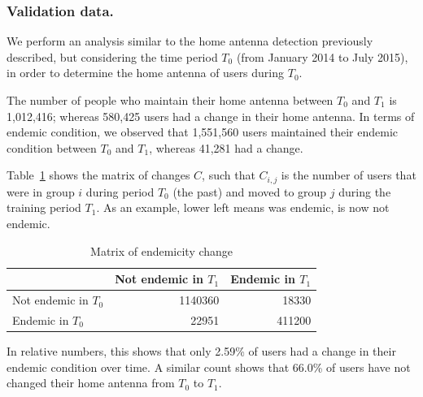 

\subsubsection{Validation data.} %

We perform an analysis similar to the home antenna detection previously described, 
but considering the time period $T_0$ (from January 2014 to July 2015),
in order to determine the home antenna of users during $T_0$.

The number of people who maintain their home antenna between $T_0$ and $T_1$ is 1,012,416;
whereas 580,425 users had a change in their home antenna.
In terms of endemic condition, we observed that 1,551,560 users maintained their endemic condition
between $T_0$ and $T_1$, whereas 41,281 had a change.


%
%
%

Table~\ref{tab:changes} 
shows the matrix of changes $C$, such that $C_{i, j}$ is the number of users that were in group $i$ during period $T_0$ (the past) and moved to group $j$ during the training period $T_1$. As an example, lower left means was endemic, is now not endemic. 

\begin{table}[ht]
	\caption{Matrix of endemicity change}
	\label{tab:changes}
	\centering
	\begin{tabular}{l r r }
		\toprule
		& Not endemic in $T_1$ & Endemic in $T_1$ \\
		\midrule
		Not endemic in $T_0$ & 1140360 & 18330  \\
		Endemic in $T_0$     & 22951   & 411200 \\
		\bottomrule
	\end{tabular}
\end{table}

In relative numbers, this shows that only 2.59\% of users had a change in their endemic condition over time. A similar count shows that 66.0\% of users have not changed their home antenna from $T_0$ to $T_1$.



